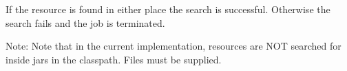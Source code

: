     If the resource is found in either place the search is successful. Otherwise the search 
    fails and the job is terminated. 

    Note: Note that in the current implementation, resources are NOT searched    
    for inside jars in the classpath. Files must be supplied. 

